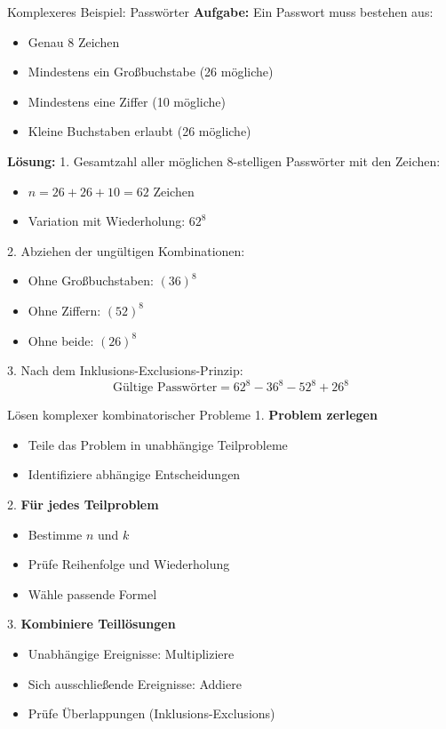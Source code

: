 \begin{example}{Komplexeres Beispiel: Passwörter}
\textbf{Aufgabe:} Ein Passwort muss bestehen aus:
\begin{itemize}
\item Genau 8 Zeichen
\item Mindestens ein Großbuchstabe (26 mögliche)
\item Mindestens eine Ziffer (10 mögliche)
\item Kleine Buchstaben erlaubt (26 mögliche)
\end{itemize}

\textbf{Lösung:}
1. Gesamtzahl aller möglichen 8-stelligen Passwörter mit den Zeichen:
   \begin{itemize}
   \item $n = 26 + 26 + 10 = 62$ Zeichen
   \item Variation mit Wiederholung: $62^8$
   \end{itemize}

2. Abziehen der ungültigen Kombinationen:
   \begin{itemize}
   \item Ohne Großbuchstaben: $(36)^8$
   \item Ohne Ziffern: $(52)^8$
   \item Ohne beide: $(26)^8$
   \end{itemize}

3. Nach dem Inklusions-Exclusions-Prinzip:
   \[ \text{Gültige Passwörter} = 62^8 - 36^8 - 52^8 + 26^8 \]
\end{example}

\begin{KR}{Lösen komplexer kombinatorischer Probleme}
1. \textbf{Problem zerlegen}
   \begin{itemize}
   \item Teile das Problem in unabhängige Teilprobleme
   \item Identifiziere abhängige Entscheidungen
   \end{itemize}

2. \textbf{Für jedes Teilproblem}
   \begin{itemize}
   \item Bestimme $n$ und $k$
   \item Prüfe Reihenfolge und Wiederholung
   \item Wähle passende Formel
   \end{itemize}

3. \textbf{Kombiniere Teillösungen}
   \begin{itemize}
   \item Unabhängige Ereignisse: Multipliziere
   \item Sich ausschließende Ereignisse: Addiere
   \item Prüfe Überlappungen (Inklusions-Exclusions)
   \end{itemize}
\end{KR}

